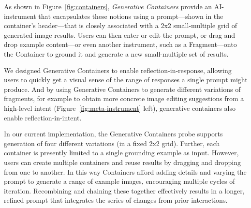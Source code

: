 As shown in Figure~\ref{fig:containers}, \textit{Generative Containers} provide an AI-instrument that encapsulates these notions using a prompt---shown in the container's header---that is closely associated with a 2x2 small-multiple grid of generated image results. Users can then enter or edit the prompt, or drag and drop  example content---or even another instrument, such as a Fragment---onto the Container to ground it and generate a new small-multiple set of results. 

We designed Generative Containers to enable reflection-in-response, allowing users to quickly get a visual sense of the range of responses a single prompt might produce. And by using Generative Containers to generate different variations of fragments, for example to obtain more concrete image editing suggestions from a high-level intent (Figure~\ref{fig:meta-instrument} left), generative containers also enable reflection-in-intent.

In our current implementation, the Generative Containers probe supports generation of four different variations (in a fixed 2x2 grid). Further, each container is presently limited to a single grounding example as input. However, users can create multiple containers and reuse results by dragging and dropping from one to another. 
In this way Containers afford adding details and varying the prompt to generate a range of example images, encouraging multiple cycles of iteration. Recombining and chaining these together effectively results in a longer, refined prompt that integrates the series of changes from prior interactions. 



